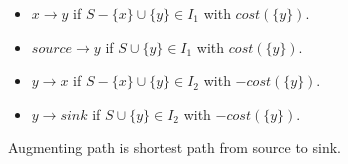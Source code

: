 \vspace{-0.5em}
\begin{itemize}
    \itemsep-0.5em
  \item $x \to y$ if $S - \{x\} \cup \{y\} \in I_1$ with $cost(\{y\})$.
  \item $source \to y$ if $S \cup \{y\} \in I_1$ with $cost(\{y\})$.
  \item $y \to x$ if $S - \{x\} \cup \{y\} \in I_2$ with $-cost(\{y\})$.
  \item $y \to sink$ if $S \cup \{y\} \in I_2$ with $-cost(\{y\})$.
\end{itemize}
Augmenting path is shortest path from source to sink.